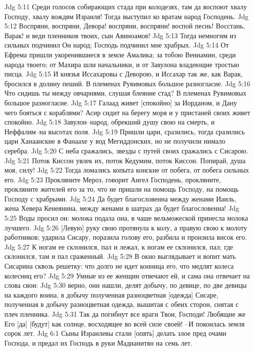 Jdg 5:11  Среди голосов собирающих стада при колодезях, там да воспоют хвалу Господу, хвалу вождям Израиля! Тогда выступил ко вратам народ Господень.
Jdg 5:12  Воспряни, воспряни, Девора! воспряни, воспряни! воспой песнь! Восстань, Варак! и веди пленников твоих, сын Авиноамов!
Jdg 5:13  Тогда немногим из сильных подчинил Он народ; Господь подчинил мне храбрых.
Jdg 5:14  От Ефрема пришли укоренившиеся в земле Амалика; за тобою Вениамин, среди народа твоего; от Махира шли начальники, и от Завулона владеющие тростью писца.
Jdg 5:15  И князья Иссахаровы с Деворою, и Иссахар так же, как Варак, бросился в долину пеший. В племенах Рувимовых большое разногласие.
Jdg 5:16  Что сидишь ты между овчарнями, слушая блеяние стад? В племенах Рувимовых большое разногласие.
Jdg 5:17  Галаад живет [спокойно] за Иорданом, и Дану чего бояться с кораблями? Асир сидит на берегу моря и у пристаней своих живет спокойно.
Jdg 5:18  Завулон--народ, обрекший душу свою на смерть, и Неффалим--на высотах поля.
Jdg 5:19  Пришли цари, сразились, тогда сразились цари Ханаанские в Фанаахе у вод Мегиддонских, но не получили нимало серебра.
Jdg 5:20  С неба сражались, звезды с путей своих сражались с Сисарою.
Jdg 5:21  Поток Киссон увлек их, поток Кедумим, поток Киссон. Попирай, душа моя, силу!
Jdg 5:22  Тогда ломались копыта конские от побега, от побега сильных его.
Jdg 5:23  Прокляните Мероз, говорит Ангел Господень, прокляните, прокляните жителей его за то, что не пришли на помощь Господу, на помощь Господу с храбрыми.
Jdg 5:24  Да будет благословенна между женами Иаиль, жена Хевера Кенеянина, между женами в шатрах да будет благословенна!
Jdg 5:25  Воды просил он: молока подала она, в чаше вельможеской принесла молока лучшего.
Jdg 5:26  [Левую] руку свою протянула к колу, а правую свою к молоту работников; ударила Сисару, поразила голову его, разбила и пронзила висок его.
Jdg 5:27  К ногам ее склонился, пал и лежал, к ногам ее склонился, пал; где склонился, там и пал сраженный.
Jdg 5:28  В окно выглядывает и вопит мать Сисарина сквозь решетку: что долго не идет конница его, что медлят колеса колесниц его?
Jdg 5:29  Умные из ее женщин отвечают ей, и сама она отвечает на слова свои:
Jdg 5:30  верно, они нашли, делят добычу, по девице, по две девицы на каждого воина, в добычу полученная разноцветная [одежда] Сисаре, полученная в добычу разноцветная одежда, вышитая с обеих сторон, снятая с плеч пленника.
Jdg 5:31  Так да погибнут все враги Твои, Господи! Любящие же Его [да] [будут] как солнце, восходящее во всей силе своей! --И покоилась земля сорок лет.
Jdg 6:1  Сыны Израилевы стали [опять] делать злое пред очами Господа, и предал их Господь в руки Мадианитян на семь лет.
